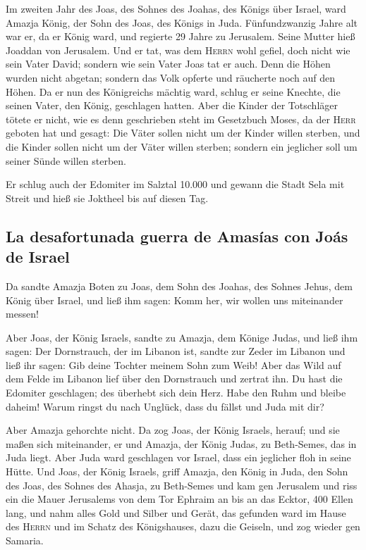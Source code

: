  Im zweiten Jahr des Joas, des Sohnes des Joahas, des
Königs über Israel, ward Amazja König, der Sohn des Joas, des Königs in
Juda.  Fünfundzwanzig Jahre alt war er, da er König ward,
und regierte 29 Jahre zu Jerusalem. Seine Mutter hieß Joaddan von
Jerusalem.  Und er tat, was dem \textsc{Herrn} wohl
gefiel, doch nicht wie sein Vater David; sondern wie sein Vater Joas tat
er auch.  Denn die Höhen wurden nicht abgetan; sondern das
Volk opferte und räucherte noch auf den Höhen.  Da er nun
des Königreichs mächtig ward, schlug er seine Knechte, die seinen Vater,
den König, geschlagen hatten.  Aber die Kinder der
Totschläger tötete er nicht, wie es denn geschrieben steht im Gesetzbuch
Moses, da der \textsc{Herr} geboten hat und gesagt: Die Väter sollen
nicht um der Kinder willen sterben, und die Kinder sollen nicht um der
Väter willen sterben; sondern ein jeglicher soll um seiner Sünde willen
sterben.

 Er schlug auch der Edomiter im Salztal 10.000 und gewann
die Stadt Sela mit Streit und hieß sie Joktheel bis auf diesen Tag.

\hypertarget{la-desafortunada-guerra-de-amasuxedas-con-jouxe1s-de-israel}{%
\subsection{La desafortunada guerra de Amasías con Joás de
Israel}\label{la-desafortunada-guerra-de-amasuxedas-con-jouxe1s-de-israel}}

 Da sandte Amazja Boten zu Joas, dem Sohn des Joahas, des
Sohnes Jehus, dem König über Israel, und ließ ihm sagen: Komm her, wir
wollen uns miteinander messen!

 Aber Joas, der König Israels, sandte zu Amazja, dem
Könige Judas, und ließ ihm sagen: Der Dornstrauch, der im Libanon ist,
sandte zur Zeder im Libanon und ließ ihr sagen: Gib deine Tochter meinem
Sohn zum Weib! Aber das Wild auf dem Felde im Libanon lief über den
Dornstrauch und zertrat ihn.  Du hast die Edomiter
geschlagen; des überhebt sich dein Herz. Habe den Ruhm und bleibe
daheim! Warum ringst du nach Unglück, dass du fällst und Juda mit dir?

 Aber Amazja gehorchte nicht. Da zog Joas, der König
Israels, herauf; und sie maßen sich miteinander, er und Amazja, der
König Judas, zu Beth-Semes, das in Juda liegt.  Aber Juda
ward geschlagen vor Israel, dass ein jeglicher floh in seine Hütte.
 Und Joas, der König Israels, griff Amazja, den König in
Juda, den Sohn des Joas, des Sohnes des Ahasja, zu Beth-Semes und kam
gen Jerusalem und riss ein die Mauer Jerusalems von dem Tor Ephraim an
bis an das Ecktor, 400 Ellen lang,  und nahm alles Gold
und Silber und Gerät, das gefunden ward im Hause des \textsc{Herrn} und
im Schatz des Königshauses, dazu die Geiseln, und zog wieder gen
Samaria.

